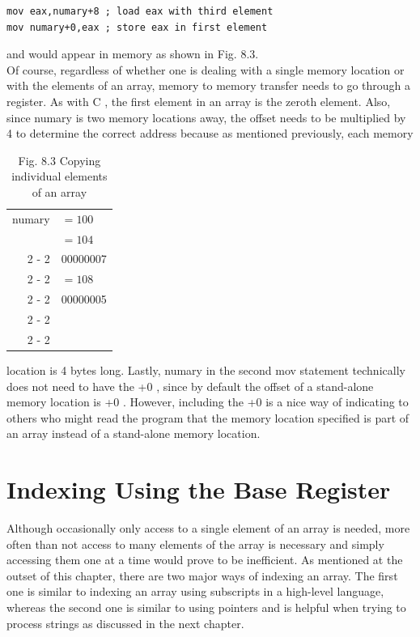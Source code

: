 \documentclass[10pt]{book}
\begin{document}
\begin{verbatim}
mov eax,numary+8 ; load eax with third element
mov numary+0,eax ; store eax in first element
\end{verbatim}

and would appear in memory as shown in Fig. 8.3.\\
Of course, regardless of whether one is dealing with a single memory location or with the elements of an array, memory to memory transfer needs to go through a register. As with C , the first element in an array is the zeroth element. Also, since numary is two memory locations away, the offset needs to be multiplied by 4 to determine the correct address because as mentioned previously, each memory

\begin{table}[htbp]
\begin{center}
\begin{tabular}{rl|}
numary & $=100$ \\
 & $=104$ \\
\cline { 2 - 2 }
 & 00000007 \\
\cline { 2 - 2 }
 & $=108$ \\
\cline { 2 - 2 }
 & 00000005 \\
\cline { 2 - 2 }
 &  \\
\cline { 2 - 2 }
\end{tabular}
\captionsetup{labelformat=empty}
\caption{Fig. 8.3 Copying individual elements of an array}
\end{center}
\end{table}

location is 4 bytes long. Lastly, numary in the second mov statement technically does not need to have the +0 , since by default the offset of a stand-alone memory location is +0 . However, including the +0 is a nice way of indicating to others who might read the program that the memory location specified is part of an array instead of a stand-alone memory location.


\section{Indexing Using the Base Register}
Although occasionally only access to a single element of an array is needed, more often than not access to many elements of the array is necessary and simply accessing them one at a time would prove to be inefficient. As mentioned at the outset of this chapter, there are two major ways of indexing an array. The first one is similar to indexing an array using subscripts in a high-level language, whereas the second one is similar to using pointers and is helpful when trying to process strings as discussed in the next chapter.
\end{document}
